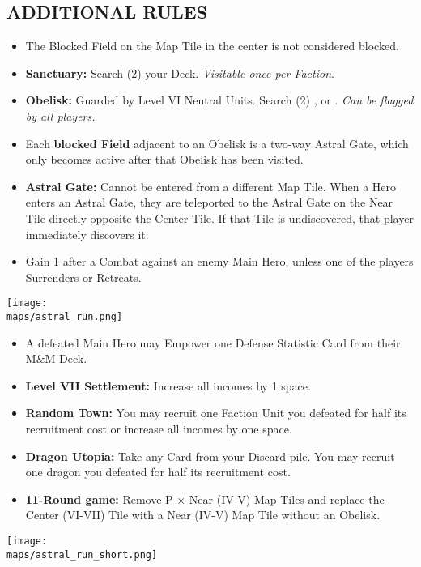 \begin{multicols*}{2}
\subsection*{\MakeUppercase{Additional Rules}}
\begin{itemize}
  \item The Blocked Field on the Map Tile in the center is not considered blocked.
  \item \textbf{Sanctuary:} Search (2) your Deck. \textit{Visitable once per Faction}.
  \item \textbf{Obelisk:} Guarded by Level VI Neutral Units. Search (2) ,  or . \textit{Can be flagged by all players.}
  \item Each \textbf{blocked Field} adjacent to an Obelisk is a two-way Astral Gate, which only becomes active after that Obelisk has been visited.
  \item \textbf{Astral Gate:} Cannot be entered from a different Map Tile. When a Hero enters an Astral Gate, they are teleported to the Astral Gate on the Near Tile directly opposite the Center Tile. If that Tile is undiscovered, that player immediately discovers it.
  \item Gain 1  after a Combat against an enemy Main Hero, unless one of the players Surrenders or Retreats.
\end{itemize}

\vspace*{\fill}
\begin{center}
  \texttt{[image: \\maps/astral\_run.png]}
\end{center}

\columnbreak

\begin{itemize}
  \item A defeated Main Hero may Empower one Defense Statistic Card from their M\&M Deck.
  \item \textbf{Level VII Settlement:} Increase all incomes by 1 space.
  \item \textbf{Random Town:} You may recruit one Faction Unit you defeated for half its recruitment cost or increase all incomes by one space.
  \item \textbf{Dragon Utopia:} Take any Card from your Discard pile. You may recruit one dragon you defeated for half its recruitment cost.
  \item \textbf{11-Round game:} Remove P × Near (IV-V) Map Tiles and replace the Center (VI-VII) Tile with a Near (IV-V) Map Tile without an Obelisk.
\end{itemize}

\begin{center}
  \hspace*{-2em}\texttt{[image: \\maps/astral\_run\_short.png]}
  \vspace*{-1em}
  \hspace*{2em}
\end{center}
\vspace*{\fill}

\end{multicols*}
